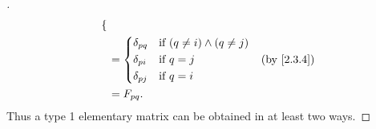 \begin{proof}[]
\begin{align*}
\begin{dcases}
                                                    \end{dcases} \\
                                                & = \begin{dcases}
                                                      \delta_{p q} & \text{if } (q \neq i) \land (q \neq j) \\
                                                      \delta_{p i} & \text{if } q = j                       \\
                                                      \delta_{p j} & \text{if } q = i
                                                    \end{dcases}    &  & \by{2.3.4}    \\
                                                & = F_{p q}.
  \end{align*}
  Thus a type 1 elementary matrix can be obtained in at least two ways.


\end{proof}
